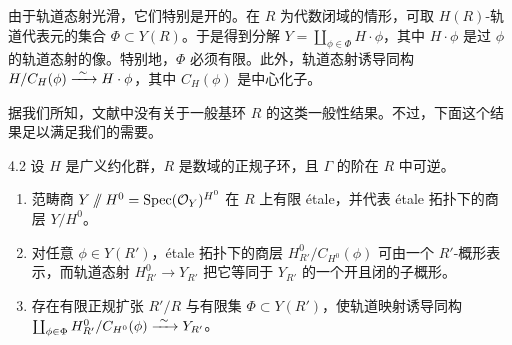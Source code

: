 由于轨道态射光滑，它们特别是开的。在 $R$ 为代数闭域的情形，可取 $H(R)$-轨道代表元的集合 $\Phi\subset Y(R)$。于是得到分解 $Y=\coprod_{\phi\in\Phi}H\cdot\phi$，其中 $H\cdot\phi$ 是过 $\phi$ 的轨道态射的像。特别地，$\Phi$ 必须有限。此外，轨道态射诱导同构 $H/C_H(\phi)\xrightarrow{\ \sim\ } H\cdot\phi$，其中 $C_H(\phi)$ 是中心化子。

据我们所知，文献中没有关于一般基环 $R$ 的这类一般性结果。不过，下面这个结果足以满足我们的需要。

\begin{thm}{4.2}\label{thm:dat-4-2}
设 $H$ 是广义约化群，$R$ 是数域的正规子环，且 $\Gamma$ 的阶在 $R$ 中可逆。
\begin{enumerate}[label=(\arabic*),leftmargin=2.4em,itemsep=0.25em]
\item 范畴商 $Y\sslash H^0=\operatorname{Spec}(\mathcal{O}_Y)^{H^0}$ 在 $R$ 上有限 étale，并代表 étale 拓扑下的商层 $Y/H^0$。
\item 对任意 $\phi\in Y(R')$，étale 拓扑下的商层 $H^0_{R'}/C_{H^0}(\phi)$ 可由一个 $R'$-概形表示，而轨道态射 $H^0_{R'}\to Y_{R'}$ 把它等同于 $Y_{R'}$ 的一个开且闭的子概形。
\item 存在有限正规扩张 $R'/R$ 与有限集 $\Phi\subset Y(R')$，使轨道映射诱导同构 $\coprod_{\phi\in\Phi}H^0_{R'}/C_{H^0}(\phi)\xrightarrow{\ \sim\ } Y_{R'}$。
\end{enumerate}
\end{thm}

